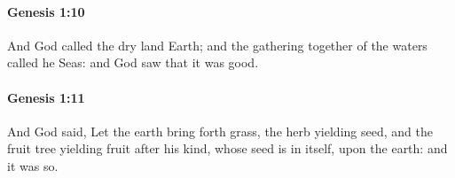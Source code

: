 		\paragraph{Genesis 1:10} %
			\label{GENESIS-1-10}

			And God called the dry land Earth; and the gathering together of the waters called he Seas: and God saw that it was good.


		\paragraph{Genesis 1:11} %
			\label{GENESIS-1-11}

			And God said, Let the earth bring forth grass, the herb yielding seed, and the fruit tree yielding fruit after his kind, whose seed is in itself, upon the earth: and it was so.


